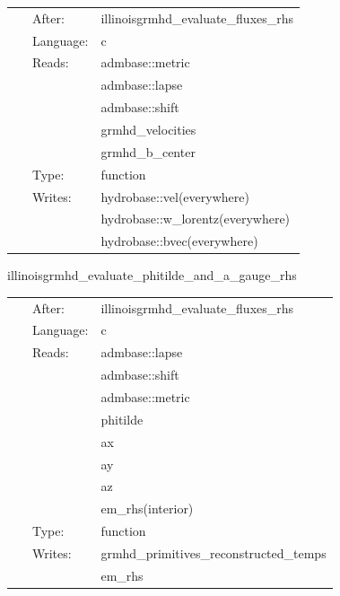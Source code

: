\hspace{5mm}

 \begin{tabular*}{160mm}{cll} 
~ & After:  & illinoisgrmhd\_evaluate\_fluxes\_rhs \\ 
~ & Language:  & c \\ 
~ & Reads:  & admbase::metric \\ 
~& ~ &admbase::lapse\\ 
~& ~ &admbase::shift\\ 
~& ~ &grmhd\_velocities\\ 
~& ~ &grmhd\_b\_center\\ 
~ & Type:  & function \\ 
~ & Writes:  & hydrobase::vel(everywhere) \\ 
~& ~ &hydrobase::w\_lorentz(everywhere)\\ 
~& ~ &hydrobase::bvec(everywhere)\\ 
\end{tabular*} 


\vspace{5mm}


\hspace{5mm} illinoisgrmhd\_evaluate\_phitilde\_and\_a\_gauge\_rhs 

\hspace{5mm}{\it evaluate phitilde rhs and gauge contributions to a\_i rhs } 


\hspace{5mm}

 \begin{tabular*}{160mm}{cll} 
~ & After:  & illinoisgrmhd\_evaluate\_fluxes\_rhs \\ 
~ & Language:  & c \\ 
~ & Reads:  & admbase::lapse \\ 
~& ~ &admbase::shift\\ 
~& ~ &admbase::metric\\ 
~& ~ &phitilde\\ 
~& ~ &ax\\ 
~& ~ &ay\\ 
~& ~ &az\\ 
~& ~ &em\_rhs(interior)\\ 
~ & Type:  & function \\ 
~ & Writes:  & grmhd\_primitives\_reconstructed\_temps \\ 
~& ~ &em\_rhs\\ 
\end{tabular*} 



